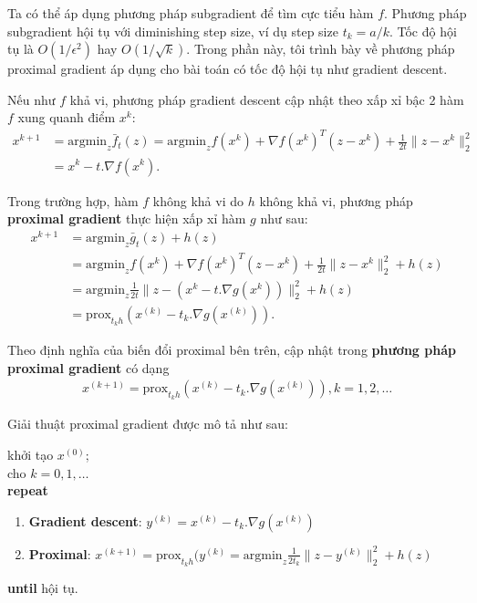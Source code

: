 \documentclass{book}
\begin{document}
Ta có thể áp dụng phương pháp subgradient để tìm cực tiểu hàm $f$. Phương pháp subgradient hội tụ với diminishing step size, ví dụ step size $t_k = a / k$. Tốc độ hội tụ là $O(1/\epsilon^2)$ hay $O(1/\sqrt{k})$. Trong phần này, tôi trình bày về phương pháp proximal gradient áp dụng cho bài toán có tốc độ hội tụ như gradient descent.

Nếu như $f$ khả vi, phương pháp gradient descent cập nhật theo xấp xỉ bậc 2 hàm $f$ xung quanh điểm $x^k$:
\begin{align*}
x^{k+1} &= \textrm{argmin}_z \bar{f}_t(z) = \textrm{argmin}_z f(x^k) + \nabla f(x^k)^T (z - x^k) + \frac{1}{2t} \| z - x^k \|^2_2 \\
		& = x^k - t . \nabla f(x^k).
\end{align*}

Trong trường hợp, hàm $f$ không khả vi do $h$ không khả vi, phương pháp \textbf{proximal gradient} thực hiện xấp xỉ hàm $g$ như sau:
\begin{align*}
x^{k+1} & = \textrm{argmin}_z \bar{g}_t(z) + h(z) \\
		& = \textrm{argmin}_z f(x^k) + \nabla f(x^k)^T (z - x^k) + \frac{1}{2t} \| z - x^k \|^2_2 + h(z)\\
		& = \textrm{argmin}_z \frac{1}{2t} \| z - (x^k - t . \nabla g(x^k))\|_2^2 + h(z) \\
		& = \textrm{prox}_{t_k h}(x^{(k)} - t_k . \nabla g(x^{(k)})).
\end{align*}

Theo định nghĩa của biến đổi proximal bên trên, cập nhật trong \textbf{phương pháp proximal gradient} có dạng
\begin{align*}
x^{(k+1)} = \textrm{prox}_{t_k h}(x^{(k)} - t_k . \nabla g(x^{(k)})), k=1, 2, \ldots
\end{align*}

Giải thuật proximal gradient được mô tả như sau:
\begin{algorithm}[H]
khởi tạo $x^{(0)}$;\\
cho $k = 0,1,\ldots$\\
\textbf{repeat} 
\begin{enumerate}
\item \textbf{Gradient descent}: $y^{(k)} = x^{(k)} - t_k . \nabla g(x^{(k)})$
\item \textbf{Proximal}: $x^{(k+1)} = \mathrm{prox}_{t_k h}(y^{(k)} =  \textrm{argmin}_z \frac{1}{2t_k} \| z - y^{(k)}\|_2^2 + h(z)$
\end{enumerate}
\textbf{until} hội tụ. 
\caption{Phương pháp proximal gradient.}
\label{alg:proximal}
\end{algorithm}
\end{document}
